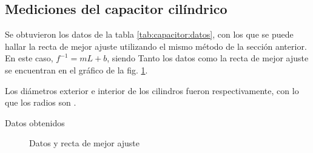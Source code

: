 \subsection{Mediciones del capacitor cilíndrico}

Se obtuvieron los datos de la tabla \ref{tab:capacitor:datos}, con los que se 
puede hallar la recta de mejor ajuste utilizando el mismo método de la sección
anterior. En este caso, $f^{-1} = mL + b$, siendo
 Tanto los datos como la recta de mejor ajuste se encuentran en el gráfico de la
fig. \ref{fig:capacitor:rectas}.

Los diámetros exterior e interior de los cilindros fueron 
 respectivamente,
con lo que los radios son 
.

\begin{table}[H]
    \centering
    \caption{Datos obtenidos}
    \label{tab:capacitor:datos}
\end{table}

\begin{figure}[H]
    \centering
    
    \caption{Datos y recta de mejor ajuste}
    \label{fig:capacitor:rectas}
\end{figure}
